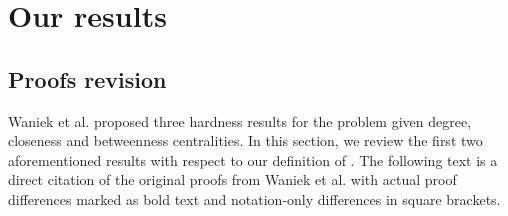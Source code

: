 \chapter{Our results}



\section{Proofs revision}\label{sec:proofRevs}

Waniek et al. \cite{Waniek2017} proposed three hardness results for the \HL problem given degree, closeness and betweenness
centralities. In this section, we review the first two aforementioned results with respect to our definition of \HLshort.
The following text is a direct citation of the original proofs from Waniek et al.
with actual proof differences marked as bold text and notation-only differences in square brackets.

